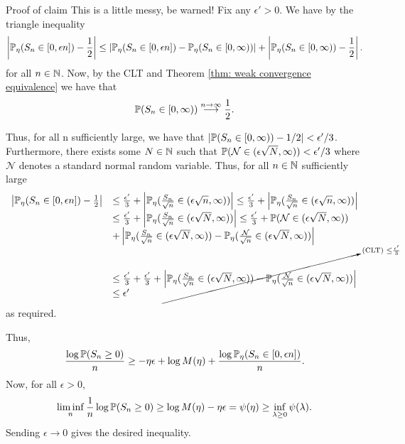 \documentclass{article}
\begin{document}
\begin{examplesblock}{Proof of claim}\label{aside: cramer clt}
This is a little messy, be warned! Fix any $ \epsilon'>0$. We have by the triangle inequality
\[
	\left| \mathbb{P}_{\eta}(S_{n}\in [0,\epsilon n])-\frac{1}{2} \right|\leq \left| \mathbb{P}_{\eta}(S_{n}\in [0,\epsilon n])- \mathbb{P}_{\eta}(S_{n}\in [0,\infty)) \right| + \left| \mathbb{P}_{\eta}(S_{n}\in [0,\infty))-\frac{1}{2} \right|.
\]
for all $ n\in \mathbb{N}$. Now, by the CLT and Theorem \ref{thm: weak convergence equivalence} we have that 
\[
\mathbb{P}(S_{n}\in[0,\infty)) \stackrel{n\to \infty}{\longrightarrow} \frac{1}{2}. 
\]

Thus, for all n sufficiently large, we have that $ |\mathbb{P}(S_{n}\in[0,\infty))-1/2|<\epsilon'/3$. Furthermore, there exists some $ N\in \mathbb{N}$ such that $ \mathbb{P}( \mathcal{N}\in(\epsilon \sqrt{N}, \infty))<\epsilon'/3$ where $ \mathcal{N}$ denotes a standard normal random variable. Thus, for all $ n\in \mathbb{N}$ sufficiently large 
\[
\begin{array}{ll}
	\left| \mathbb{P}_{\eta}(S_{n} \in [0,\epsilon n])-\frac{1}{2} \right|&\leq \frac{\epsilon'}{3}+ \left| \mathbb{P}_{\eta}(\frac{S_{n}}{\sqrt{n}}\in (\epsilon \sqrt{n},\infty))\right| \leq \frac{\epsilon'}{3} + \left| \mathbb{P}_{\eta}(\frac{S_{n}}{\sqrt{n}}\in (\epsilon \sqrt{n},\infty))\right| \\
								       &\leq \frac{\epsilon'}{3} + \left| \mathbb{P}_{\eta}(\frac{S_{n}}{\sqrt{n}}\in (\epsilon \sqrt{N},\infty))\right| \leq  \frac{\epsilon'}{3} + \mathbb{P}( \mathcal{N}\in(\epsilon \sqrt{N}, \infty))\\ 
								       &+ \left| \mathbb{P}_{\eta}(\frac{S_{n}}{\sqrt{n}}\in (\epsilon \sqrt{N},\infty))- \mathbb{P}_{\eta}(\frac{ \mathcal{N}}{\sqrt{n}}\in (\epsilon \sqrt{N},\infty))\right|\\  
								       &\leq \frac{\epsilon'}{3}+ \frac{\epsilon'}{3} + \cancelto{\text{(CLT) }\leq \frac{\epsilon'}{3}}{\left| \mathbb{P}_{\eta}(\frac{S_{n}}{\sqrt{n}}\in (\epsilon \sqrt{N},\infty))- \mathbb{P}_{\eta}(\frac{ \mathcal{N}}{\sqrt{n}}\in (\epsilon \sqrt{N},\infty))\right|}\\
								       &\leq \epsilon'
\end{array}
\]
as required.
\end{examplesblock}

Thus, 
\[
	\frac{\log \mathbb{P}(S_{n}\geq 0)}{n}\geq -\eta \epsilon +\log M(\eta) + \frac{\log\mathbb{P}_{\eta}(S_{n}\in[0,\epsilon n])}{n}.
\]
Now, for all $ \epsilon> 0$, 
\[
 \displaystyle\liminf_{ n}\frac{1}{n}\log \mathbb{P}(S_{n}\geq 0 )\geq \log M(\eta) -\eta \epsilon= \psi(\eta)\geq \displaystyle\inf_{\lambda \geq 0}\psi(\lambda).
\]
Sending $ \epsilon \to 0$ gives the desired inequality.\\ 
\end{document}
